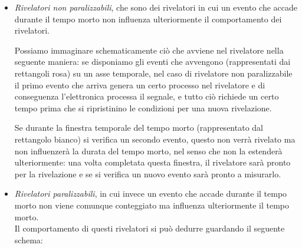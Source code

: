 \begin{itemize}[leftmargin=0.5cm]
   \item \textit{Rivelatori non paralizzabili}, che sono dei rivelatori in cui un evento che accade durante il tempo morto non influenza ulteriormente il comportamento dei rivelatori.
   
   Possiamo immaginare schematicamente ciò che avviene nel rivelatore nella seguente maniera: se disponiamo gli eventi che avvengono (rappresentati dai rettangoli rosa) su un asse temporale, nel caso di rivelatore non paralizzabile il primo evento che arriva genera un certo processo nel rivelatore e di conseguenza l'elettronica processa il segnale, e tutto ciò richiede un certo tempo prima che si ripristinino le condizioni per una nuova rivelazione.
   \begin{figure}[H]
      \centering
   \end{figure}
    Se durante la finestra temporale del tempo morto (rappresentato dal rettangolo bianco) si verifica un secondo evento, questo non verrà rivelato ma non influenzerà la durata del tempo morto, nel senso che non la estenderà ulteriormente: una volta completata questa finestra, il rivelatore sarà pronto per la rivelazione e se si verifica un nuovo evento sarà pronto a misurarlo.

   \item \textit{Rivelatori paralizzabili}, in cui invece un evento che accade durante il tempo morto non viene comunque conteggiato ma influenza ulteriormente il tempo morto.\\
   Il comportamento di questi rivelatori si può dedurre guardando il seguente schema:
   \begin{figure}[H]
      \centering
   \end{figure}
\end{itemize}

